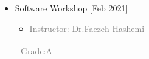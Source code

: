 \documentclass[10pt,a4paper,sans]{moderncv} %
\begin{document}
\begin{multicols}{2}
\begin{itemize}
\begin{itemize}
\begin{itemize}
                 \end{itemize}   
                 
			    \end{itemize}
			    
			\item {} Software Workshop \hfill[Feb 2021]
               \begin{itemize}
                \item\textcolor{gray}{Instructor: 
                {Dr.Faezeh Hashemi}}
                \end{itemize}
                
                \begin{itemize}
                \textcolor{gray}{- Grade:A }\textsuperscript{+}
                \end{itemize}
                
            
                 
			    
		     			


			
			\vspace{0.1 em} 
			
				
				
				
				
			
			\vspace{0.3 em} 
			

			\end{itemize}

		
	\end{multicols}
	
	\vspace{5.6 em}
	
\end{document}
